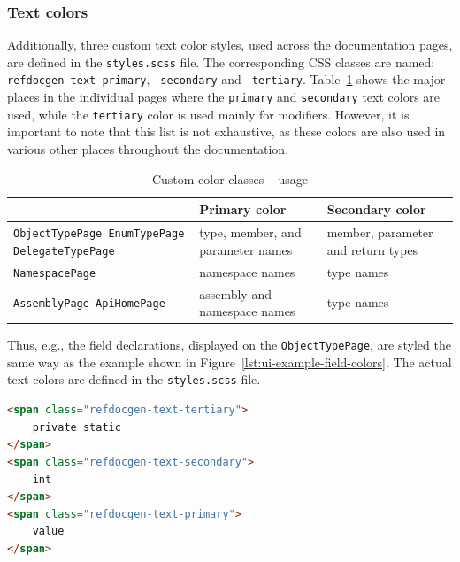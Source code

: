 \subsubsection{Text colors}
\label{sec:ui-text-colors}

Additionally, three custom text color styles, used across the documentation pages, are defined in the \texttt{styles.scss} file.
The corresponding CSS classes are named: \texttt{refdocgen-text-primary}, \texttt{-secondary} and \texttt{-tertiary}.
Table~\ref{table:ui-refdocgen-colors} shows the major places in the individual pages where the \texttt{primary} and \texttt{secondary} text colors are used, 
while the \texttt{tertiary} color is used mainly for modifiers.
However, it is important to note that this list is not exhaustive, as these colors are also used in various other places throughout the documentation.

\begin{table}[h]
\centering
\begin{tabular}{|p{4cm}|p{4cm}|p{4cm}|}
\hline
\textbf{} & \textbf{Primary color} & \textbf{Secondary color} \\
\hline
\texttt{ObjectTypePage EnumTypePage DelegateTypePage} & type, member, and parameter names & member, parameter and return types \\
\hline
\texttt{NamespacePage} & namespace names & type names \\
\hline
\texttt{AssemblyPage ApiHomePage} & assembly and namespace names & type names \\
\hline
\end{tabular}
\caption{Custom color classes -- usage}
\label{table:ui-refdocgen-colors}
\end{table}

Thus, e.g., the field declarations, displayed on the \texttt{ObjectTypePage}, are styled the same way as the example shown in Figure~\ref{lst:ui-example-field-colors}. The actual text colors are defined in the \texttt{styles.scss} file.

\begin{listing}[H]
\begin{lstlisting}[language=HTML]
<span class="refdocgen-text-tertiary">
    private static
</span>
<span class="refdocgen-text-secondary">
    int
</span>
<span class="refdocgen-text-primary">
    value
</span>
\end{lstlisting}
\caption{Example field declaration HTML}
\label{lst:ui-example-field-colors}
\end{listing}

